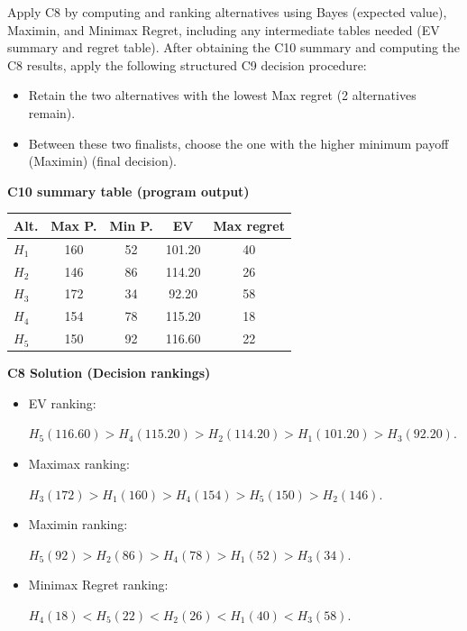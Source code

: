 \begin{ExamProblems}
		Apply C8 by computing and ranking alternatives using Bayes (expected value), Maximin, and Minimax Regret, including any intermediate tables needed (EV summary and regret table).
		After obtaining the C10 summary and computing the C8 results, apply the following structured C9 decision procedure:
		\begin{itemize}
			\item Retain the two alternatives with the lowest Max regret (2 alternatives remain).
			\item Between these two finalists, choose the one with the higher minimum payoff (Maximin) (final decision).
		\end{itemize}
		
		\vspace{0.25cm}
		
		\textbf{C10 summary table (program output)}\par
		\begin{center}
			\begin{tabular}{l c c c c}
				\hline
				Alt. & Max P. & Min P. & EV & Max regret \\
				\hline
				$H_1$ & 160 & 52 & 101.20 & 40 \\
				$H_2$ & 146 & 86 & 114.20 & 26 \\
				$H_3$ & 172 & 34 & 92.20 & 58 \\
				$H_4$ & 154 & 78 & 115.20 & 18 \\
				$H_5$ & 150 & 92 & 116.60 & 22 \\
				\hline
			\end{tabular}
		\end{center}
		
		\textbf{C8 Solution (Decision rankings)}\par
		\begin{itemize}
			\item EV ranking: \par $H_5(116.60)>H_4(115.20)>H_2(114.20)>H_1(101.20)>H_3(92.20)$.
			\item Maximax ranking:\par $H_3(172)>H_1(160)>H_4(154)>H_5(150)>H_2(146)$.
			\item Maximin ranking: \par $H_5(92)>H_2(86)>H_4(78)>H_1(52)>H_3(34)$.
			\item Minimax Regret ranking:\par $H_4(18)<H_5(22)<H_2(26)<H_1(40)<H_3(58)$.
		\end{itemize}
		

\end{ExamProblems}
